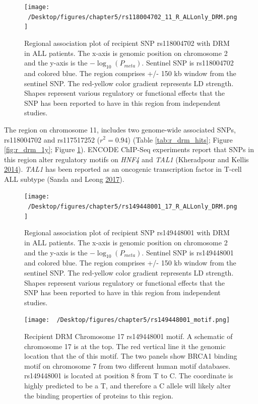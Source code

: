 \documentclass[]{DissertateOSU}
\begin{document}
\begin{figure}
    \centering
    \texttt{[image: ~/Desktop/figures/chapter5/rs118004702\_11\_R\_ALLonly\_DRM.png]}
    \caption[Regional association plot of recipient SNP rs118004702 with DRM in ALL patients.]{Regional association plot of recipient SNP rs118004702 with DRM in ALL patients. The x-axis is genomic position on chromosome 2 and the y-axis is the $-\log_{10}(P_{meta})$. Sentinel SNP is rs118004702 and colored blue. The region comprises +/- 150 kb window from the sentinel SNP. The red-yellow color gradient represents LD strength. Shapes represent various regulatory or functional effects that the SNP has been reported to have in this region from independent studies.}
    \label{fig:r_drm_1y_chr11reg}  
\end{figure}

The region on chromosome 11, includes two genome-wide associated SNPs,
rs118004702 and rs117517252 (\(r^2=0.94\)) (Table \ref{tab:r_drm_hits};
Figure \ref{fig:r_drm_1y}; Figure \ref{fig:r_drm_1y_chr11reg}). ENCODE
ChIP-Seq experiments report that SNPs in this region alter regulatory
motifs on \emph{HNF4} and \emph{TAL1} (Kheradpour and Kellis
\protect\hyperlink{ref-motifs_2014}{2014}). \emph{TAL1} has been
reported as an oncogenic transcription factor in T-cell ALL subtype
(Sanda and Leong \protect\hyperlink{ref-sanda_2017}{2017}).

\begin{figure}
    \centering
    \texttt{[image: ~/Desktop/figures/chapter5/rs149448001\_17\_R\_ALLonly\_DRM.png]}
    \caption[Regional association plot of recipient SNP rs149448001 with DRM in ALL patients.]{Regional association plot of recipient SNP rs149448001 with DRM in ALL patients. The x-axis is genomic position on chromosome 2 and the y-axis is the $-\log_{10}(P_{meta})$. Sentinel SNP is rs149448001 and colored blue. The region comprises +/- 150 kb window from the sentinel SNP. The red-yellow color gradient represents LD strength. Shapes represent various regulatory or functional effects that the SNP has been reported to have in this region from independent studies.}
    \label{fig:r_drm_1y_chr17reg}  
\end{figure}

\begin{figure}
    \centering
    \texttt{[image: ~/Desktop/figures/chapter5/rs149448001\_motif.png]}
    \caption[Recipient DRM Chromosome 17 rs149448001 motif.]{Recipient DRM Chromosome 17 rs149448001 motif. A schematic of chromosome 17 is at the top. The red vertical line it the genomic location that the of this motif. The two panels show BRCA1 binding motif on chromosome 7 from two different human motif databases. rs149448001 is located at position 8 from T to C. The coordinate is highly predicted to be a T, and therefore a C allele will likely alter the binding properties of proteins to this region.}
    \label{fig:r_drm_motif}  
\end{figure}
\end{document}
